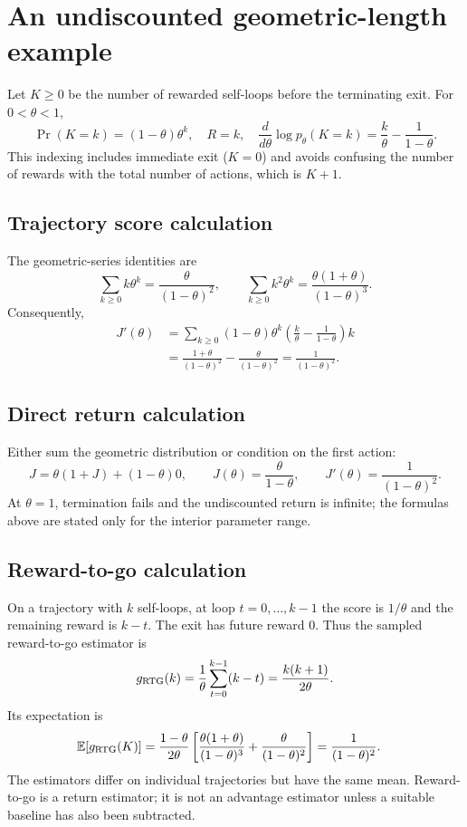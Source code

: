 \newpage
\section{An undiscounted geometric-length example}
Let $K\geq0$ be the number of rewarded self-loops before the terminating
exit. For $0<\theta<1$,
\[
 \Pr(K=k)=(1-\theta)\theta^k,\quad R=k,\quad
 \frac{d}{d\theta}\log p_\theta(K=k)=\frac{k}{\theta}-\frac1{1-\theta}.
\]
This indexing includes immediate exit ($K=0$) and avoids confusing the number
of rewards with the total number of actions, which is $K+1$.

\subsection{Trajectory score calculation}
The geometric-series identities are
\[
 \sum_{k\geq0}k\theta^k=\frac{\theta}{(1-\theta)^2},\qquad
 \sum_{k\geq0}k^2\theta^k=\frac{\theta(1+\theta)}{(1-\theta)^3}.
\]
Consequently,
\begin{align*}
 J'(\theta)
 &=\sum_{k\geq0}(1-\theta)\theta^k
       \left(\frac{k}{\theta}-\frac1{1-\theta}\right)k\\
 &=\frac{1+\theta}{(1-\theta)^2}
          -\frac{\theta}{(1-\theta)^2}
 =\boxed{\frac1{(1-\theta)^2}}.
\end{align*}

\subsection{Direct return calculation}
Either sum the geometric distribution or condition on the first action:
\[
 J=\theta(1+J)+(1-\theta)0,\qquad
 J(\theta)=\frac{\theta}{1-\theta},\qquad
 J'(\theta)=\frac1{(1-\theta)^2}.
\]
At $\theta=1$, termination fails and the undiscounted return is infinite;
the formulas above are stated only for the interior parameter range.

\subsection{Reward-to-go calculation}
On a trajectory with $k$ self-loops, at loop $t=0,\ldots,k-1$ the score
is $1/\theta$ and the remaining reward is $k-t$. The exit has future reward 0.
Thus the sampled reward-to-go estimator is
\[
 g_{\rm RTG}(k)=\frac1\theta\sum_{t=0}^{k-1}(k-t)
             =\frac{k(k+1)}{2\theta}.
\]
Its expectation is
\begin{align*}
 \mathbb{E}[g_{\rm RTG}(K)]
 &=\frac{1-\theta}{2\theta}
   \left[\frac{\theta(1+\theta)}{(1-\theta)^3}
                 +\frac{\theta}{(1-\theta)^2}\right]
 =\frac1{(1-\theta)^2}.
\end{align*}
The estimators differ on individual trajectories but have the same mean.
Reward-to-go is a return estimator; it is not an advantage estimator unless
a suitable baseline has also been subtracted.

